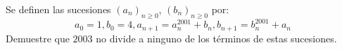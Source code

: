 Se definen las sucesiones $(a_n)_{n \geq 0}$, $(b_n)_{n \geq 0}$ por:
\[ a_0 = 1, b_0 = 4, a_{n+1} = a_n^{2001} + b_n, b_{n+1} = b_n^{2001} + a_n \]
Demuestre que $2003$ no divide a ninguno de los términos de estas sucesiones.
